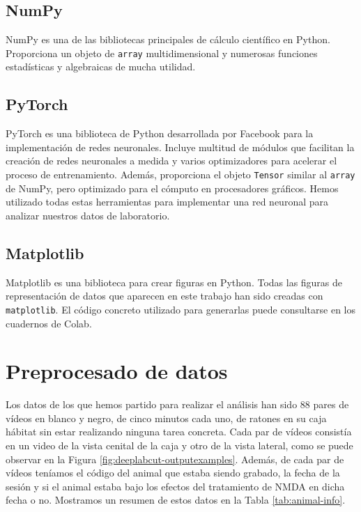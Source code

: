 \subsection*{NumPy}
NumPy es una de las bibliotecas principales de cálculo científico en Python. Proporciona un objeto de \texttt{array} multidimensional y numerosas funciones estadísticas y algebraicas de mucha utilidad.

\subsection*{PyTorch}
PyTorch \cite{pytorch-paper} es una biblioteca de Python desarrollada por Facebook para la implementación de redes neuronales. Incluye multitud de módulos que facilitan la creación de redes neuronales a medida y varios optimizadores para acelerar el proceso de entrenamiento. Además, proporciona el objeto \texttt{Tensor} similar al \texttt{array} de NumPy, pero optimizado para el cómputo en procesadores gráficos. Hemos utilizado todas estas herramientas para implementar una red neuronal para analizar nuestros datos de laboratorio.

\subsection*{Matplotlib}
Matplotlib es una biblioteca para crear figuras en Python. Todas las figuras de representación de datos que aparecen en este trabajo han sido creadas con \texttt{matplotlib}. El código concreto utilizado para generarlas puede consultarse en los cuadernos de Colab.

\section{Preprocesado de datos} \label{sec:preprocesado}

Los datos de los que hemos partido para realizar el análisis han sido 88 pares de vídeos en blanco y negro, de cinco minutos cada uno, de ratones en su caja hábitat sin estar realizando ninguna tarea concreta. Cada par de vídeos consistía en un video de la vista cenital de la caja y otro de la vista lateral, como se puede observar en la Figura \ref{fig:deeplabcut-outputexamples}. Además, de cada par de vídeos teníamos el código del animal que estaba siendo grabado, la fecha de la sesión y si el animal estaba bajo los efectos del tratamiento de NMDA en dicha fecha o no. Mostramos un resumen de estos datos en la Tabla \ref{tab:animal-info}.

